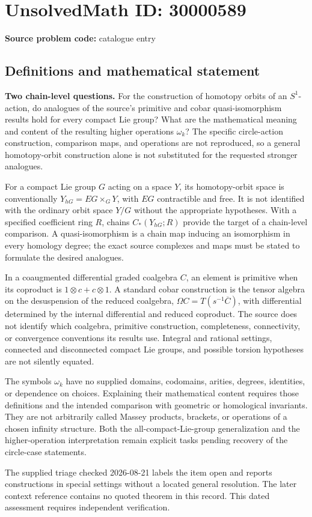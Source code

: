 \documentclass[11pt]{article}
\begin{document}
\section*{UnsolvedMath ID: 30000589}
\textbf{Source problem code:} catalogue entry
\subsection{Definitions and mathematical statement}
\textbf{Two chain-level questions.} For the construction of homotopy orbits of an \(S^1\)-action, do analogues of the source's primitive and cobar quasi-isomorphism results hold for every compact Lie group? What are the mathematical meaning and content of the resulting higher operations \(\omega_k\)? The specific circle-action construction, comparison maps, and operations are not reproduced, so a general homotopy-orbit construction alone is not substituted for the requested stronger analogues.\par For a compact Lie group \(G\) acting on a space \(Y\), its homotopy-orbit space is conventionally \(Y_{hG}=EG\times_GY\), with \(EG\) contractible and free. It is not identified with the ordinary orbit space \(Y/G\) without the appropriate hypotheses. With a specified coefficient ring \(R\), chains \(C_*(Y_{hG};R)\) provide the target of a chain-level comparison. A quasi-isomorphism is a chain map inducing an isomorphism in every homology degree; the exact source complexes and maps must be stated to formulate the desired analogues.\par In a coaugmented differential graded coalgebra \(C\), an element is primitive when its coproduct is \(1\otimes c+c\otimes1\). A standard cobar construction is the tensor algebra on the desuspension of the reduced coalgebra, \(\Omega C=T(s^{-1}\overline C)\), with differential determined by the internal differential and reduced coproduct. The source does not identify which coalgebra, primitive construction, completeness, connectivity, or convergence conventions its results use. Integral and rational settings, connected and disconnected compact Lie groups, and possible torsion hypotheses are not silently equated.\par The symbols \(\omega_k\) have no supplied domains, codomains, arities, degrees, identities, or dependence on choices. Explaining their mathematical content requires those definitions and the intended comparison with geometric or homological invariants. They are not arbitrarily called Massey products, brackets, or operations of a chosen infinity structure. Both the all-compact-Lie-group generalization and the higher-operation interpretation remain explicit tasks pending recovery of the circle-case statements.\par The supplied triage checked 2026-08-21 labels the item open and reports constructions in special settings without a located general resolution. The later context reference contains no quoted theorem in this record. This dated assessment requires independent verification.
\end{document}

